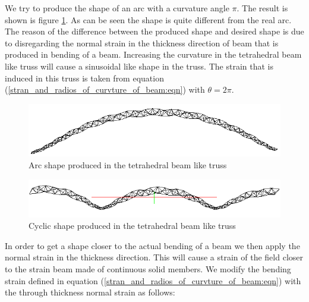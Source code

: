 We try to produce the shape of an arc with a curvature angle $\pi$.
The result is shown is figure \ref{fig:tetra_hedral_arc_pi_shape}.
As can be seen the shape is quite different from the real arc.
The reason of the difference between the produced shape and desired shape is due to disregarding the normal strain in the thickness direction of beam that is produced in bending of a beam.
Increasing the curvature in the tetrahedral beam like truss will cause a sinusoidal like shape in the truss.
The strain that is induced in this truss is taken from equation (\ref{stran_and_radios_of_curvture_of_beam:eqn}) with $\theta=2 \pi$.

\begin{figure} 
\centering
\includegraphics[width=5.0in]{./chap_5_active_trusses/images_linear_tetrahedral/tetra_hedral_arc_pi_shape.png}
\caption{Arc shape produced in the tetrahedral beam like truss}
\label{fig:tetra_hedral_arc_pi_shape}
\end{figure}  


\begin{figure} 
\centering
\includegraphics[width=5.0in]{./chap_5_active_trusses/images_linear_tetrahedral/tetra_hedral_arc_2_pi_shape.png}
\caption{Cyclic shape produced in the tetrahedral beam like truss}
\label{fig:tetra_hedral_arc_2_pi_shape}
\end{figure} 

In order to get a shape closer to the actual bending of a beam we then apply the normal strain in the thickness direction.
This will cause a strain of the field closer to the strain beam made of continuous solid members.
We modify the bending strain defined in equation (\ref{stran_and_radios_of_curvture_of_beam:eqn}) with the through thickness normal strain as follows:

